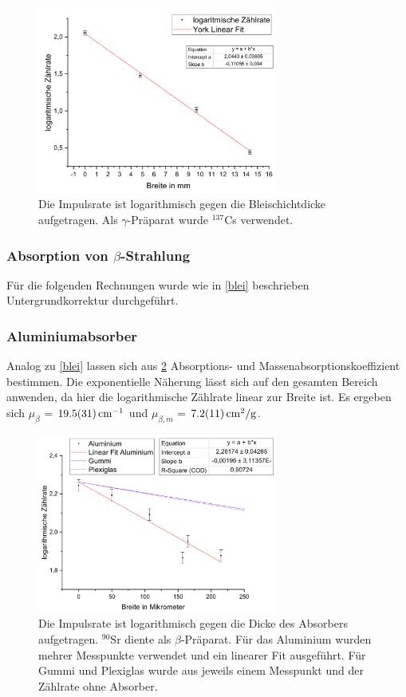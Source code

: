 \documentclass[
	a4paper,
	12pt,
	pagesize,
	ngerman
]{scrartcl}
\begin{document}
	\begin{figure}[H]
		\includegraphics[width=0.7\textwidth]{GammaBlei}
		\centering
		\caption{Die Impulsrate ist logarithmisch gegen die Bleischichtdicke aufgetragen. Als $\gamma$-Präparat wurde $ ^{137}$Cs verwendet.}%
		\label{GammaBlei}
		\centering
	\end{figure}
	
	
	
	\subsubsection{Absorption von $\beta$-Strahlung} 
	Für die folgenden Rechnungen wurde wie in \cref{blei} beschrieben Untergrundkorrektur durchgeführt.
	\subsubsection*{Aluminiumabsorber}
	
	Analog zu \cref{blei} lassen sich aus \cref{BetaAlu} Absorptions- und Massenabsorptionskoeffizient bestimmen. 
	Die exponentielle Näherung lässt sich auf den gesamten Bereich anwenden, da hier die logarithmische Zählrate linear zur Breite ist.
	Es ergeben sich $\mu_\beta$ = $\SI{19,5 +- 3,1}{cm^{-1}}$ und $\mu_{\beta,m}$ = $\SI{7,2+-1,1}{cm^2/g}$.\cite{dichten}
	\begin{figure}[H]
		\includegraphics[width=0.7\textwidth]{BetaAlu}
		\centering
		\caption{Die Impulsrate ist logarithmisch gegen die Dicke des Absorbers aufgetragen. $ ^{90}$Sr diente als $\beta$-Präparat. Für das Aluminium wurden mehrer Messpunkte verwendet und ein linearer Fit ausgeführt. Für Gummi und Plexiglas wurde aus jeweils einem Messpunkt und der Zählrate ohne Absorber.}
		\label{BetaAlu}
		\centering
	\end{figure}
\end{document}
